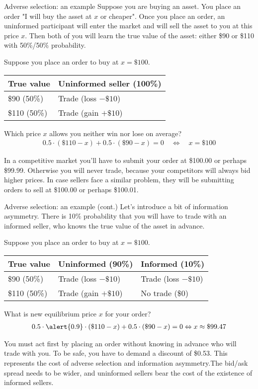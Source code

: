 \documentclass{beamer}
\begin{document}
\begin{frame}{Adverse selection: an example}
\justify
Suppose you are buying an asset. You place an order "I will buy the asset at $x$ or cheaper". Once you place an order, an uninformed participant will enter the market and will sell the asset to you at this price $x$. Then both of you will learn the true value of the asset: either \$90 or \$110 with 50\%/50\% probability.

\justify
Suppose you place an order to buy at $x=\$100$.

\centering
\begin{tabular}{l|l}
True value & Uninformed seller (100\%)  \\ \hline
\$90 (50\%) & Trade (loss $-\$10$) \\ \hline
\$110 (50\%) & Trade (gain $+\$10$) 
\end{tabular}

\justify
Which price $x$ allows you neither win nor lose on average?
\begin{align*}
0.5\cdot(\$110 - x) + 0.5\cdot(\$90 - x) = 0 \quad \Leftrightarrow \quad x = \$100
\end{align*}

\justify
In a competitive market you'll have to submit your order at \$100.00 or perhaps \$99.99. Otherwise you will never trade, because your competitors will always bid higher prices. In case sellers face a similar problem, they will be submitting orders to sell at \$100.00 or perhaps \$100.01.
\end{frame}



\begin{frame}{Adverse selection: an example (cont.)}
\justify
Let's introduce a bit of information asymmetry. There is 10\% probability that you will have to trade with an \alert{informed} seller, who knows the true value of the asset in advance.

\justify
Suppose you place an order to buy at $x=\$100$.

\centering
\begin{tabular}{l|l|l}
True value & Uninformed (90\%) & Informed (10\%) \\ \hline
\$90 (50\%) & Trade (loss $-\$10$) & Trade (loss $-\$10$) \\ \hline
\$110 (50\%) & Trade (gain $+\$10$) & \alert{No trade (\$0)} 
\end{tabular}

\justify
What is new equilibrium price $x$ for your order?
\begin{align*}
0.5\cdot\alert{0.9}\cdot(\$110 - x) + 0.5 \cdot (\$90 - x) = 0 \Leftrightarrow x \approx \$99.47
\end{align*}

\justify
You must act first by placing an order without knowing in advance who will trade with you. To be safe, you have to demand a discount of \$0.53. This represents the cost of adverse selection and information asymmetry.The bid/ask spread needs to be wider, and uninformed sellers bear the cost of the existence of informed sellers.
\end{frame}
\end{document}
